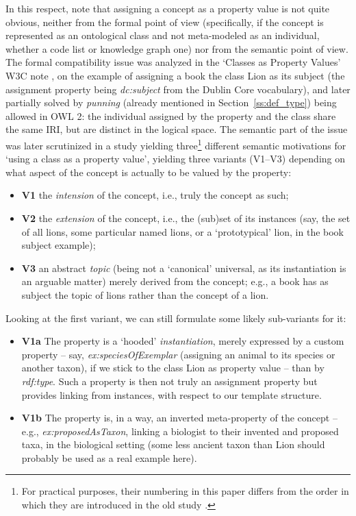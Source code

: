 In this respect, note that assigning a concept as a property value is not quite obvious, neither from the formal point of view (specifically, if the concept is represented as an ontological class and not meta-modeled as an individual, whether a code list or knowledge graph one) nor from the semantic point of view.
    The formal compatibility issue was analyzed in the `Classes as Property Values' W3C note \cite{CPV}, on the example of assigning a book the class Lion as its subject (the assignment property being \emph{dc:subject} from the Dublin Core vocabulary), and later partially solved by \emph{punning} (already mentioned in Section~\ref{ss:def_type}) being allowed in OWL 2: the individual assigned by the property and the class share the same IRI, but are distinct in the logical space.
The semantic part of the issue was later scrutinized in a study \cite{KCap13} yielding three\footnote{For practical purposes, their numbering in this paper differs from the order in which they are introduced in the old study \cite{KCap13}.} different semantic motivations for `using a class as a property value', yielding three variants (V1--V3) depending on what aspect of the concept is actually to be valued by the property: 
\begin{itemize}
    \item \textbf{V1} the \emph{intension} of the concept, i.e., truly the concept as such;
    \item \textbf{V2} the \emph{extension} of the concept, i.e., the (sub)set of its instances (say, the set of all lions, some particular named lions, or a `prototypical' lion, in the book subject example);
    \item \textbf{V3}  an abstract \emph{topic} (being not a `canonical' universal, as its instantiation is an arguable matter) merely derived from the concept; e.g., a book has as subject the topic of lions rather than the concept of a lion.
    \end{itemize}
Looking at the first variant, we can still formulate some likely sub-variants for it: 
\begin{itemize}
    \item \textbf{V1a} The property is a `hooded' \emph{instantiation}, merely expressed by a custom property -- say, \emph{ex:speciesOfExemplar} (assigning an animal to its species or another taxon), if we stick to the class Lion as property value -- than by \emph{rdf:type}. Such a property is then not truly an assignment property but provides linking from instances, with respect to our template structure.
    \item \textbf{V1b} The property is, in a way, an inverted meta-property of the concept -- e.g., \emph{ex:proposedAsTaxon}, linking a biologist to their invented and proposed taxa, in the biological setting (some less ancient taxon than Lion should probably be used as a real example here). 
\end{itemize}

